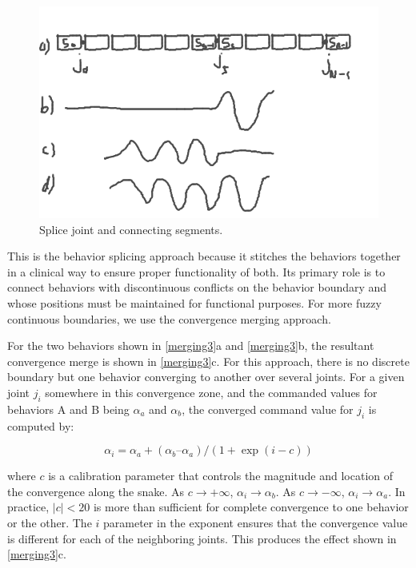 \begin{figure}[htbp]
\centering
\includegraphics[keepaspectratio,width=400pt,height=0.75\textheight]{2_behaviors_2.png}
\caption{Splice joint and connecting segments.}
\label{merging2}
\end{figure}



This is the behavior splicing approach because it stitches the behaviors together in a clinical way to ensure proper functionality of both. Its primary role is to connect behaviors with discontinuous conflicts on the behavior boundary and whose positions must be maintained for functional purposes. For more fuzzy continuous boundaries, we use the convergence merging approach.

For the two behaviors shown in \autoref{merging3}a and \autoref{merging3}b, the resultant convergence merge is shown in \autoref{merging3}c. For this approach, there is no discrete boundary but one behavior converging to another over several joints. For a given joint $j_i$ somewhere in this convergence zone, and the commanded values for behaviors A and B being $\alpha_a$ and $\alpha_b$, the converged command value for $j_i$ is computed by:


\begin{equation}
\label{equ:slide}
\alpha_i = \alpha_a + (\alpha_b – \alpha_a) / ( 1 + \exp(i-c))
\end{equation}


where $c$ is a calibration parameter that controls the magnitude and location of the convergence along the snake. As $c \to +\infty$, $\alpha_i \to \alpha_b$. As $c \to -\infty$, $\alpha_i \to \alpha_a$. In practice, $|c| < 20$ is more than sufficient for complete convergence to one behavior or the other. The $i$ parameter in the exponent ensures that the convergence value is different for each of the neighboring joints. This produces the effect shown in \autoref{merging3}c.

